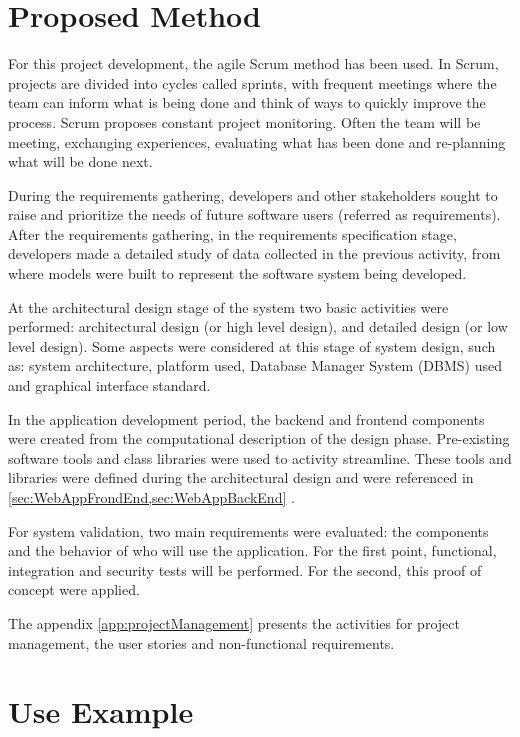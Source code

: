 \label{chap:useExample}

\acresetall 

\section{Proposed Method}\label{sec:method}

For this project development, the agile Scrum method has been used. In Scrum, projects are divided into cycles called sprints, with frequent meetings where the team can inform what is being done and think of ways to quickly improve the process. Scrum proposes constant project monitoring. Often the team will be meeting, exchanging experiences, evaluating what has been done and re-planning what will be done next.

During the requirements gathering, developers and other stakeholders sought to raise and prioritize the needs of future software users (referred as requirements). After the requirements gathering, in the requirements specification stage, developers made a detailed study of data collected in the previous activity, from where models were built to represent the software system being developed.

At the architectural design stage of the system two basic activities were performed: architectural design (or high level design), and detailed design (or low level design). Some aspects were considered at this stage of system design, such as: system architecture, platform used, Database Manager System (DBMS) used and graphical interface standard.

In the application development period, the backend and frontend components were created from the computational description of the design phase. Pre-existing software tools and class libraries were used to activity streamline. These tools and libraries were defined during the architectural design and were referenced in \cref{sec:WebAppFrondEnd,sec:WebAppBackEnd} .

For system validation, two main requirements were evaluated: the components and the behavior of who will use the application. For the first point, functional, integration and security tests will be performed. For the second, this proof of concept were applied.

The appendix \ref{app:projectManagement} presents the activities for project management, the user stories and non-functional requirements. 


\section{Use Example}\label{sec:workflow}

